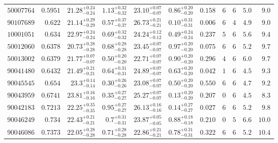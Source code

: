 \documentclass[11pt,twocolumn]{article}
\begin{document}
\begin{table}[!t]
\begin{tabular}{@{}rrrrrrrccrr@{}}
$50007764$ & $0.5951$ & $21.28^{+0.24}_{-0.24}$ & $1.13^{+0.32}_{-0.32}$ & $23.10^{+0.07}_{-0.07}$ & $0.86^{+0.20}_{-0.20}$ & $0.158$ & $6$ & $6$ & $5.0$ & $9.0$\\

$90107689$ & $0.622$ & $21.14^{+0.29}_{-0.29}$ & $0.57^{+0.37}_{-0.37}$ & $26.73^{+0.21}_{-0.21}$ & $0.10^{+0.31}_{-0.31}$ & $0.006$ & $6$ & $4$ & $4.9$ & $9.0$\\

 $10001051$ & $0.634$ & $22.97^{+0.24}_{-0.24}$  & $0.69^{+0.32}_{-0.32}$ & $24.24^{+0.12}_{-0.12}$ & $0.49^{+0.24}_{-0.24}$ & $0.237$ & $5$ & $6$ & $5.6$ & $9.4$\\

$50012060$ & $0.6378$ & $20.73^{+0.28}_{-0.28}$ & $0.68^{+0.28}_{-0.28}$ & $23.45^{+0.07}_{-0.07}$ & $0.97^{+0.20}_{-0.20}$ & $0.075$ & $6$ & $6$ & $5.2$ & $9.7$\\

$50013002$ & $0.6379$ & $21.77^{+0.07}_{-0.07}$ & $0.50^{+0.20}_{-0.20}$ & $22.71^{+0.07}_{-0.07}$ & $0.90^{+0.20}_{-0.20}$ & $0.296$ & $4$ & $6$ & $6.0$ & $9.7$\\

$90041480$ & $0.6432$ & $21.49 ^{+0.21}_{-0.21}$ & $0.64^{+0.31}_{-0.31}$ & $24.89^{+0.07}_{-0.07}$ & $0.63^{+0.20}_{-0.20}$ & $0.042$ & $1$ & $6$ & $4.5$ & $9.3$\\

$90045545$ & $0.654$ & $23.3^{+0.14}_{-0.14}$ & $0.30^{+0.26}_{-0.26}$ & $23.08^{+0.07}_{-0.07}$ & $0.50^{+ 0.20}_{-0.20}$ & $0.550$ & $6$ & $6$ & $4.7$ & $9.2$\\

$90043959$ & $0.6741$ & $23.81^{+0.16}_{-0.16}$ & $0.35^{+0.27}_{-0.27}$ & $25.27^{+0.07}_{-0.07}$ & $0.13^{+0.20}_{-0.20}$ & $0.207$ & $0$ & $6$ & $4.5$ & $8.3$\\

$90042183$ & $0.7213$ & $22.25^{+0.35}_{-0.35}$ & $0.95^{+0.27}_{-0.27}$ & $26.13^{+0.16}_{-0.16} $ & $0.14^{+0.27}_{-0.27}$ & $0.027$ & $6$ & $6$ & $5.2$ & $9.8$\\

$90046249$ & $0.734$ & $22.43^{+0.21}_{-0.21}$ & $0.7 ^{+0.31}_{-0.31}$ & $23.87^{+0.05}_{-0.05}$ & $0.88^{+0.18}_{-0.18}$ & $0.210$ & $0$ & $5$ & $6.6$ & $10.0$\\

  $90046086$ & $0.7373$ & $22.05^{+0.28}_{-0.28}$ & $0.71^{+0.28}_{-0.28}$ & $22.86^{+0.21}_{-0.21}$ & $0.78^{+0.31}_{-0.31}$ & $0.322$ & $6$ & $6$ & $5.2$ & $10.4$\\


\end{tabular}
\end{table}
\end{document}
